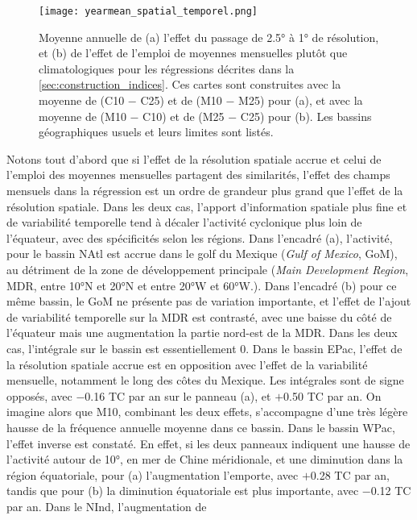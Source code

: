 \documentclass[../main.tex]{subfiles}
\begin{document}
\begin{figure}[tb]
    \centering
    \texttt{[image: yearmean\_spatial\_temporel.png]}
    \caption{Moyenne annuelle de (a) l'effet du passage de \ang{2.5} à \ang{1} de résolution, et (b) de l'effet de l'emploi de moyennes mensuelles plutôt que
    climatologiques pour les régressions décrites dans la \cref{sec:construction_indices}. Ces cartes sont construites avec la moyenne de (C10 $-$ C25) et de
    (M10 $-$ M25) pour (a), et avec la moyenne de (M10 $-$ C10) et de (M25 $-$ C25) pour (b). Les bassins géographiques usuels et leurs limites sont listés.}
    \label{fig:impact_spatial_temporel}
\end{figure}

Notons tout d'abord que si l'effet de la résolution spatiale accrue et celui de l'emploi des moyennes mensuelles partagent des similarités, l'effet des champs
mensuels dans la régression est un ordre de grandeur plus grand que l'effet de la résolution spatiale. Dans les deux cas, l'apport d'information spatiale plus
fine et de variabilité temporelle tend à décaler l'activité cyclonique plus loin de l'équateur, avec des spécificités selon les régions. Dans l'encadré (a),
l'activité, pour le bassin NAtl est accrue dans le golf du Mexique (\textit{Gulf of Mexico}, GoM), au détriment de la zone de développement
principale (\textit{Main Development Region}, MDR, entre \ang{10}N et \ang{20}N et entre \ang{20}W et \ang{60}W.). Dans l'encadré (b) pour ce même bassin, le
GoM ne présente pas de variation importante, et l'effet de l'ajout de variabilité temporelle sur la MDR est contrasté, avec une baisse du côté de l'équateur
mais une augmentation la partie nord-est de la MDR. Dans les deux cas, l'intégrale sur le bassin est essentiellement \num{0}. Dans le bassin EPac, l'effet de la
résolution spatiale accrue est en opposition avec l'effet de la variabilité mensuelle, notamment le long des côtes du Mexique. Les intégrales sont de signe
opposés, avec \num{-0.16} TC par an sur le panneau (a), et $+$\num{0.50} TC par an. On imagine alors que M10, combinant les deux effets, s'accompagne d'une très
légère hausse de la fréquence annuelle moyenne dans ce bassin. Dans le bassin WPac, l'effet inverse est constaté. En effet, si les deux panneaux indiquent
une hausse de l'activité autour de \ang{10}, en mer de Chine méridionale, et une diminution dans la région équatoriale, pour (a) l'augmentation l'emporte, avec
$+$\num{0.28} TC par an, tandis que pour (b) la diminution équatoriale est plus importante, avec \num{-0.12} TC par an. Dans le NInd, l'augmentation de
\end{document}
